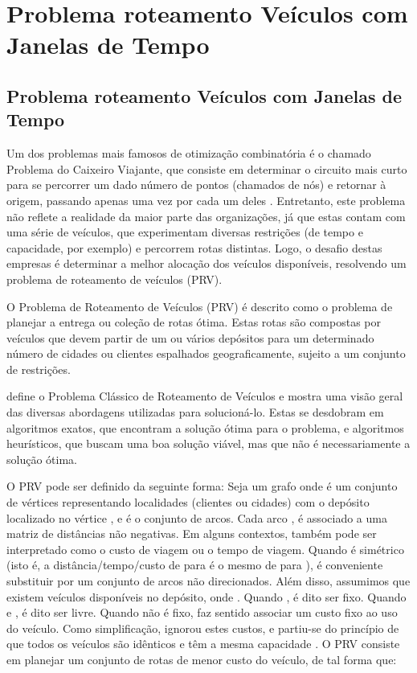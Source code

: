 ﻿\chapter{Problema roteamento Veículos com Janelas de Tempo}
\label{cap:Problema_roteamento}

\section{Problema roteamento Veículos com Janelas de Tempo}

Um dos problemas mais famosos de otimização combinatória é o chamado Problema do Caixeiro Viajante, que consiste em determinar o circuito mais curto para se percorrer um dado número de pontos (chamados de nós) e retornar à origem, passando apenas uma vez por cada um deles \cite{lieberman10}. Entretanto, este problema não reflete a realidade da maior parte das organizações, já que estas contam com uma série de veículos, que experimentam diversas restrições (de tempo e capacidade, por exemplo) e percorrem rotas distintas. Logo, o desafio destas empresas é determinar a melhor alocação dos veículos disponíveis, resolvendo um problema de roteamento de veículos (PRV).

O Problema de Roteamento de Veículos (PRV) é descrito como o problema de planejar a entrega ou coleção de rotas ótima. Estas rotas são compostas por veículos que devem partir de um ou vários depósitos para um determinado número de cidades ou clientes espalhados geograficamente, sujeito a um conjunto de restrições.

\cite{laporte92} define o Problema Clássico de Roteamento de Veículos e mostra uma visão geral das diversas abordagens utilizadas para solucioná-lo. Estas se desdobram em algoritmos exatos, que encontram a solução ótima para o problema, e algoritmos heurísticos, que buscam uma boa solução viável, mas que não é necessariamente a solução ótima.

O PRV pode ser definido da seguinte forma: Seja um grafo onde é um conjunto de vértices representando localidades (clientes ou cidades) com o depósito localizado no vértice , e é o conjunto de arcos. Cada arco , é associado a uma matriz de distâncias não negativas. Em alguns contextos, também pode ser interpretado como o custo de viagem ou o tempo de viagem. Quando é simétrico (isto é, a distância/tempo/custo de para é o mesmo de para ), é conveniente substituir por um conjunto de arcos não direcionados. Além disso, assumimos que existem veículos disponíveis no depósito, onde . Quando , é dito ser fixo. Quando e , é dito ser livre. Quando não é fixo, faz sentido associar um custo fixo ao uso do veículo. Como simplificação, \cite{laporte92} ignorou estes custos, e partiu-se do princípio de que todos os veículos são idênticos e têm a mesma capacidade . O PRV consiste em planejar um conjunto de rotas de menor custo do veículo, de tal forma que:


